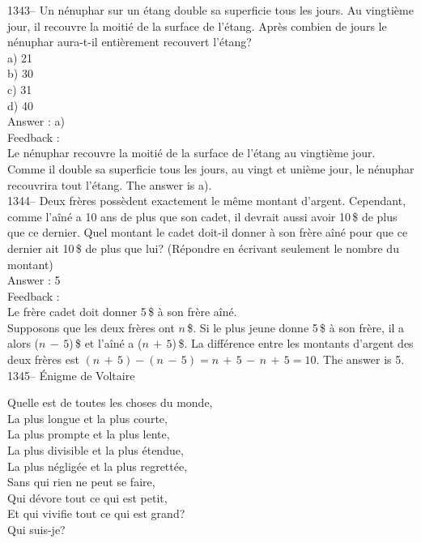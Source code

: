 \documentclass[letterpaper, 12pt]{article}
\begin{document}
1343-- Un n\'enuphar sur un \'etang double sa superficie tous les jours.  Au
vingti\`eme jour, il recouvre la moiti\'e de la surface de l'\'etang.
Apr\`es combien de jours le n\'enuphar aura-t-il enti\`erement recouvert
l'\'etang?\\
a) 21\\
b) 30\\
c) 31\\
d) 40\\

Answer : a)\\

Feedback : \\
Le n\'enuphar recouvre la moiti\'e de la surface de l'\'etang au vingti\`eme
jour.  Comme il double sa superficie tous les jours, au vingt et uni\`eme
jour, le n\'enuphar recouvrira tout l'\'etang.  The answer is a).\\

1344-- Deux fr\`eres poss\`edent exactement le m\^eme montant d'argent.
Cependant, comme l'a\^in\'e a 10 ans de plus que son cadet, il devrait aussi
avoir 10\,\$ de plus que ce dernier. Quel montant le cadet doit-il donner
\`a son fr\`ere a\^in\'e pour que ce dernier ait 10\,\$ de plus que lui?
(R\'epondre en \'ecrivant seulement le nombre du montant)\\

Answer : 5\\

Feedback : \\
Le fr\`ere cadet doit donner 5\,\$ \`a son fr\`ere a\^in\'e.  \\
Supposons que les deux fr\`eres ont $n$\,\$.  Si le plus jeune donne 5\,\$
\`a son fr\`ere, il a alors ($n\,-\,5$)\,\$ et l'a\^in\'e a ($n\,+\,5$)\,\$.
  La diff\'erence entre les montants d'argent des deux fr\`eres est
$(n\,+\,5)-(n\,-\,5)=n\,+\,5\,-\,n\,+\,5=10$.  The answer is 5.\\

1345-- \'Enigme de Voltaire\\
\begin{center}{Quelle est de toutes les choses du monde,\\
La plus longue et la plus courte,\\
La plus prompte et la plus lente,\\
La plus divisible et la plus \'etendue,\\
La plus n\'eglig\'ee et la plus regrett\'ee,\\
Sans qui rien ne peut se faire,\\
Qui d\'evore tout ce qui est petit,\\
Et qui vivifie tout ce qui est grand?\\
Qui suis-je?\\}
\end{center}
\end{document}
